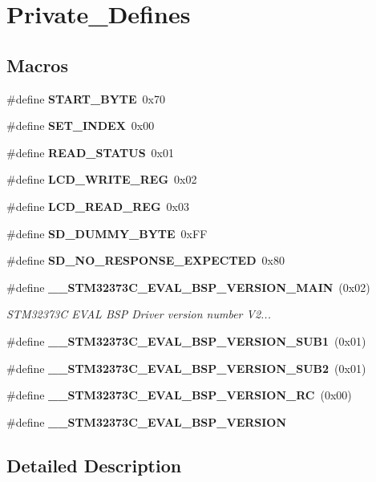 \section{Private\+\_\+\+Defines}
\label{group___private___defines}
\subsection*{Macros}
\begin{DoxyCompactItemize}
\item 
\#define \textbf{ S\+T\+A\+R\+T\+\_\+\+B\+Y\+TE}~0x70
\item 
\#define \textbf{ S\+E\+T\+\_\+\+I\+N\+D\+EX}~0x00
\item 
\#define \textbf{ R\+E\+A\+D\+\_\+\+S\+T\+A\+T\+US}~0x01
\item 
\#define \textbf{ L\+C\+D\+\_\+\+W\+R\+I\+T\+E\+\_\+\+R\+EG}~0x02
\item 
\#define \textbf{ L\+C\+D\+\_\+\+R\+E\+A\+D\+\_\+\+R\+EG}~0x03
\item 
\#define \textbf{ S\+D\+\_\+\+D\+U\+M\+M\+Y\+\_\+\+B\+Y\+TE}~0x\+FF
\item 
\#define \textbf{ S\+D\+\_\+\+N\+O\+\_\+\+R\+E\+S\+P\+O\+N\+S\+E\+\_\+\+E\+X\+P\+E\+C\+T\+ED}~0x80
\item 
\#define \textbf{ \+\_\+\+\_\+\+S\+T\+M32373\+C\+\_\+\+E\+V\+A\+L\+\_\+\+B\+S\+P\+\_\+\+V\+E\+R\+S\+I\+O\+N\+\_\+\+M\+A\+IN}~(0x02)
\begin{DoxyCompactList}\small\item\em S\+T\+M32373C E\+V\+AL B\+SP Driver version number V2... \end{DoxyCompactList}\item 
\#define \textbf{ \+\_\+\+\_\+\+S\+T\+M32373\+C\+\_\+\+E\+V\+A\+L\+\_\+\+B\+S\+P\+\_\+\+V\+E\+R\+S\+I\+O\+N\+\_\+\+S\+U\+B1}~(0x01)
\item 
\#define \textbf{ \+\_\+\+\_\+\+S\+T\+M32373\+C\+\_\+\+E\+V\+A\+L\+\_\+\+B\+S\+P\+\_\+\+V\+E\+R\+S\+I\+O\+N\+\_\+\+S\+U\+B2}~(0x01)
\item 
\#define \textbf{ \+\_\+\+\_\+\+S\+T\+M32373\+C\+\_\+\+E\+V\+A\+L\+\_\+\+B\+S\+P\+\_\+\+V\+E\+R\+S\+I\+O\+N\+\_\+\+RC}~(0x00)
\item 
\#define \textbf{ \+\_\+\+\_\+\+S\+T\+M32373\+C\+\_\+\+E\+V\+A\+L\+\_\+\+B\+S\+P\+\_\+\+V\+E\+R\+S\+I\+ON}
\end{DoxyCompactItemize}


\subsection{Detailed Description}


